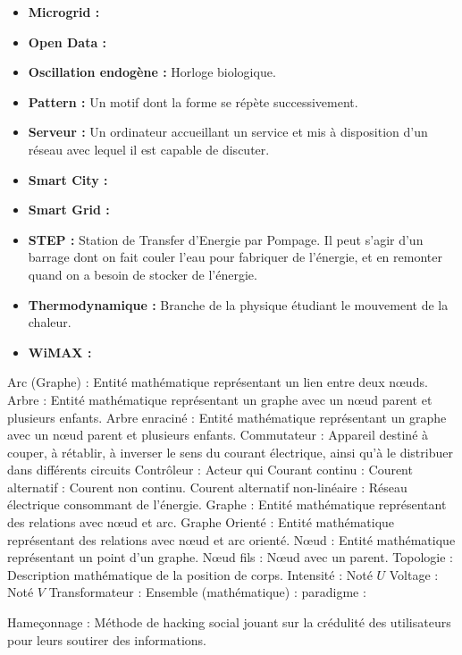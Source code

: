 \begin{itemize}
    \item \textbf{Microgrid :}
    \item \textbf{Open Data :}
    \item \textbf{Oscillation endogène :} Horloge biologique.
    \item \textbf{Pattern :} Un motif dont la forme se répète successivement.
    \item \textbf{Serveur :} Un ordinateur accueillant un service et mis à disposition d'un réseau avec lequel il est capable de discuter.
    \item \textbf{Smart City :}
    \item \textbf{Smart Grid :}
    \item \textbf{STEP :} Station de Transfer d'Energie par Pompage.
Il peut s'agir d'un barrage dont on fait couler l'eau pour fabriquer de l'énergie, et en remonter quand on a besoin de stocker de l'énergie.
    \item \textbf{Thermodynamique :} Branche de la physique étudiant le mouvement de la chaleur.
    \item \textbf{WiMAX :}
\end{itemize}


Arc (Graphe) : Entité mathématique représentant un lien entre deux nœuds.
Arbre : Entité mathématique représentant un graphe avec un nœud parent et plusieurs enfants.
Arbre enraciné : Entité mathématique représentant un graphe avec un nœud parent et plusieurs enfants.
Commutateur : Appareil destiné à couper, à rétablir, à inverser le sens du courant électrique, ainsi qu'à le distribuer dans différents circuits
Contrôleur : Acteur qui
Courant continu :
Courent alternatif : Courent non continu.
Courent alternatif non-linéaire : Réseau électrique consommant de l'énergie.
Graphe : Entité mathématique représentant des relations avec nœud et arc.
Graphe Orienté : Entité mathématique représentant des relations avec nœud et arc orienté.
Nœud : Entité mathématique représentant un point d'un graphe.
Nœud fils : Nœud avec un parent.
Topologie : Description mathématique de la position de corps.
Intensité : Noté $U$
Voltage : Noté $V$
Transformateur :
Ensemble (mathématique) :
paradigme :

Hameçonnage : Méthode de hacking social jouant sur la crédulité des utilisateurs pour leurs soutirer des informations.